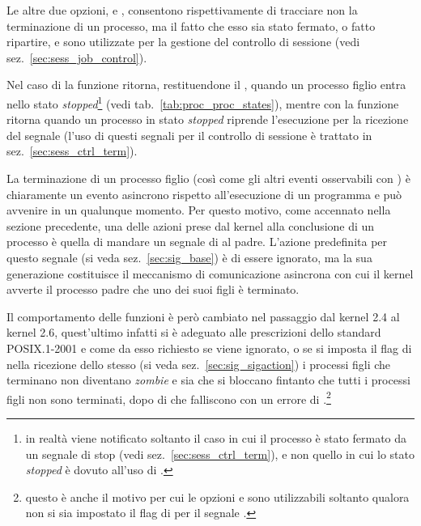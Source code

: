 
Le altre due opzioni,  e , consentono
rispettivamente di tracciare non la terminazione di un processo, ma il fatto
che esso sia stato fermato, o fatto ripartire, e sono utilizzate per la
gestione del controllo di sessione (vedi sez.~\ref{sec:sess_job_control}).

Nel caso di  la funzione ritorna, restituendone il ,
quando un processo figlio entra nello stato \textit{stopped}\footnote{in
  realtà viene notificato soltanto il caso in cui il processo è stato fermato
  da un segnale di stop (vedi sez.~\ref{sec:sess_ctrl_term}), e non quello in
  cui lo stato \textit{stopped} è dovuto all'uso di .} (vedi
tab.~\ref{tab:proc_proc_states}), mentre con  la funzione
ritorna quando un processo in stato \textit{stopped} riprende l'esecuzione per
la ricezione del segnale  (l'uso di questi segnali per il
controllo di sessione è trattato in sez.~\ref{sec:sess_ctrl_term}).


La terminazione di un processo figlio (così come gli altri eventi osservabili
con ) è chiaramente un evento asincrono rispetto all'esecuzione
di un programma e può avvenire in un qualunque momento. Per questo motivo,
come accennato nella sezione precedente, una delle azioni prese dal kernel
alla conclusione di un processo è quella di mandare un segnale di
 al padre. L'azione predefinita per questo segnale (si veda
sez.~\ref{sec:sig_base}) è di essere ignorato, ma la sua generazione
costituisce il meccanismo di comunicazione asincrona con cui il kernel avverte
il processo padre che uno dei suoi figli è terminato.

Il comportamento delle funzioni è però cambiato nel passaggio dal kernel 2.4
al kernel 2.6, quest'ultimo infatti si è adeguato alle prescrizioni dello
standard POSIX.1-2001 e come da esso richiesto se  viene
ignorato, o se si imposta il flag di  nella ricezione
dello stesso (si veda sez.~\ref{sec:sig_sigaction}) i processi figli che
terminano non diventano \textit{zombie} e sia  che 
si bloccano fintanto che tutti i processi figli non sono terminati, dopo di
che falliscono con un errore di .\footnote{questo è anche il
  motivo per cui le opzioni  e  sono
  utilizzabili soltanto qualora non si sia impostato il flag di
   per il segnale .}

